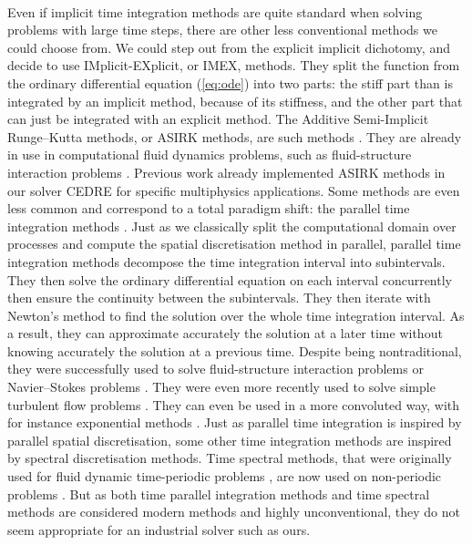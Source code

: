   \paragraph{}
  Even if implicit time integration methods are quite standard when solving problems with large time steps, there are other less conventional methods we could choose from.
  We could step out from the explicit implicit dichotomy, and decide to use IMplicit-EXplicit, or IMEX, methods.
  They split the function from the ordinary differential equation (\ref{eq:ode}) into two parts: the stiff part than is integrated by an implicit method, because of its stiffness, and the other part that can just be integrated with an explicit method.
  The Additive Semi-Implicit Runge--Kutta methods, or ASIRK methods, are such methods \cite{Zhong1996}.
  They are already in use in computational fluid dynamics problems, such as fluid-structure interaction problems \cite{HuangPerssonZahr2019}.
  Previous work already implemented ASIRK methods in our solver CEDRE for specific multiphysics applications.
  Some methods are even less common and correspond to a total paradigm shift: the parallel time integration methods \cite{Nievergelt1964, LionsMadayTurinici2001}.
  Just as we classically split the computational domain over processes and compute the spatial discretisation method in parallel, parallel time integration methods decompose the time integration interval into subintervals.
  They then solve the ordinary differential equation on each interval concurrently then ensure the continuity between the subintervals.
  They then iterate with Newton's method to find the solution over the whole time integration interval.
  As a result, they can approximate accurately the solution at a later time without knowing accurately the solution at a previous time.
  Despite being nontraditional, they were successfully used to solve fluid-structure interaction problems or Navier--Stokes problems \cite{GanderVandewalle2007}.
  They were even more recently used to solve simple turbulent flow problems \cite{Lunet2018}.
  They can even be used in a more convoluted way, with for instance exponential methods \cite{GanderGuettel2013}.
  Just as parallel time integration is inspired by parallel spatial discretisation, some other time integration methods are inspired by spectral discretisation methods.
  Time spectral methods, that were originally used for fluid dynamic time-periodic problems \cite{GopinathJameson2005, GopinathJameson2006}, are now used on non-periodic problems \cite{EkiciDjeddiLiEtAl2020}.
  But as both time parallel integration methods and time spectral methods are considered modern methods and highly unconventional, they do not seem appropriate for an industrial solver such as ours.


